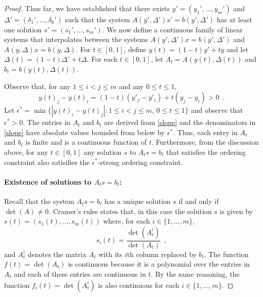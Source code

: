 \documentclass{patmorin}
\begin{document}
\begin{proof}
   Thus far, we have established that there exists $y'=(y_1',\ldots,y_m')$
   and $\Delta'=(\delta_1',\ldots,\delta_6')$ such that the
   system $A(y',\Delta')s' = b(y',\Delta')$ has at least one
   solution $s'=(s_1',\ldots,s_m')$.  We now define a continuous
   family of linear systems that interpolates between the systems
   $A(y',\Delta')x=b(y',\Delta')$ and $A(y,\Delta)x=b(y,\Delta)$.
   For $t\in[0,1]$, define $y(t) = (1-t)y' + ty$ and let
   $\Delta(t)=(1-t)\Delta' + t\Delta$.  For each $t\in [0,1]$, let
   $A_t=A(y(t),\Delta(t))$ and $b_t=b(y(t),\Delta(t))$.

   Observe that, for any $1\le i< j\le m$ and any $0\le t\le 1$,
   \[
       y(t)_j - y(t)_i = (1-t)(y'_j-y'_i) + t(y_j-y_i) > 0 \enspace .
   \]
   Let $\epsilon^*=\min\{|y(t)_i-y(t)_j| : 1\le i< j\le m,\, 0\le t\le 1\}$
   and observe that $\epsilon^* >0$.  The entries in $A_t$ and $b_t$
   are derived from \eqref{slope} and the denominators in \eqref{slope}
   have absolute values bounded from below by $\epsilon^*$.  Thus, each
   entry in $A_t$ and $b_t$ is finite and is a continuous function of $t$. 
   Furthermore, from the discussion above, for any $t\in[0,1]$ any
   solution $s$ to $A_t s =b_t$ that satisfies the ordering constraint
   also satisifies the $\epsilon^*$-strong ordering constraint.

   \paragraph{Existence of solutions to $A_ts=b_t$:}
   Recall that the system $A_ts=b_t$ has a unique solution $s$ if and
   only if $\det(A)\neq 0$.  Cramer's rules states that, in this case
   the solution $s$ is given by $s(t)=(s_1(t),\ldots,s_m(t))$ where,
   for each $i\in\{1,\ldots,m\}$,
   \[ 
       s_i(t) = \frac{\det(A_t^i)}{\det(A_t)} \enspace ,
   \]
   and $A_t^i$ denotes the matrix $A_t$ with its $i$th column replaced
   by $b_t$. The function $f(t)=\det(A_t)$ is continuous because
   it is a polynomial over the entries in $A_t$ and each of these
   entries are continuous in $t$. By the same reasoning, the function
   $f_i(t)=\det(A_t^i)$ is also continuous for each $i\in\{1,\ldots,m\}$.


\end{proof}
\end{document}
